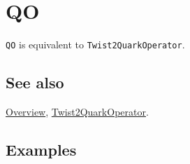 \documentclass[../FeynCalcManual.tex]{subfiles}
\begin{document}
\hypertarget{qo}{
\section{QO}\label{qo}}

\texttt{QO} is equivalent to \texttt{Twist2QuarkOperator}.

\subsection{See also}

\hyperlink{toc}{Overview},
\hyperlink{twist2quarkoperator}{Twist2QuarkOperator}.

\subsection{Examples}
\end{document}
